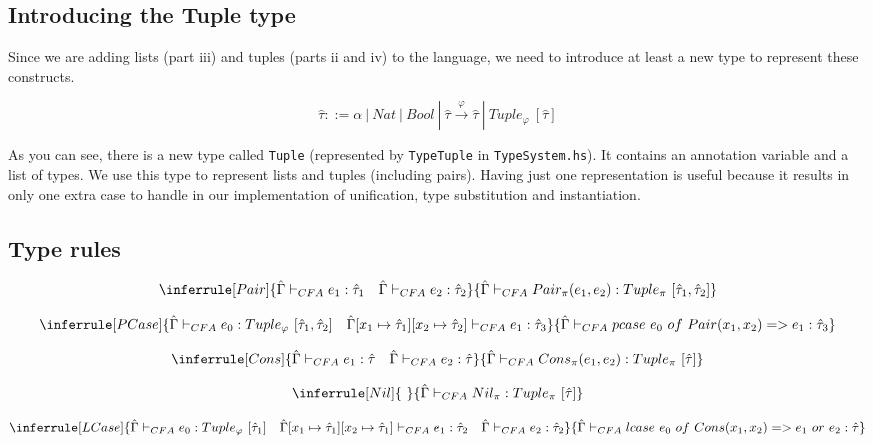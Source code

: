 \documentclass{article}
\begin{document}
\subsection{Introducing the Tuple type}

Since we are adding lists (part iii) and tuples (parts ii and iv) to the language, we need to introduce at least a new type to represent these constructs.

\[\hat{\tau} ::= \alpha\ |\ Nat\ |\ Bool\ |\ \hat{\tau} \overset{\varphi}{\rightarrow} \hat{\tau}\ |\ Tuple_\varphi\ [\hat{\tau}] \]

As you can see, there is a new type called \texttt{Tuple} (represented by \texttt{TypeTuple} in \texttt{TypeSystem.hs}).
It contains an annotation variable and a list of types.
We use this type to represent lists and tuples (including pairs).
Having just one representation is useful because it results in only one extra case to handle in our implementation of unification, type substitution and instantiation.

\subsection{Type rules}

\[
\inferrule[Pair]{\hat{\Gamma} \vdash_{CFA} e_1 : \hat{\tau}_1 \quad \hat{\Gamma} \vdash_{CFA} e_2 : \hat{\tau}_2}
{\hat{\Gamma} \vdash_{CFA} Pair_\pi(e_1, e_2) : Tuple_\pi\ [\hat{\tau}_1, \hat{\tau}_2]}
\]

\bigskip

\[
\inferrule[PCase]
{\hat{\Gamma} \vdash_{CFA} e_0 : Tuple_\varphi\ [\hat{\tau}_1, \hat{\tau}_2] \quad \hat{\Gamma}[x_1 \mapsto \hat{\tau}_1][x_2 \mapsto \hat{\tau}_2] \vdash_{CFA} e_1 : \hat{\tau}_3}
{\hat{\Gamma} \vdash_{CFA} pcase\ e_0\ of\ Pair(x_1, x_2) => e_1 : \hat{\tau}_3}
\]

\bigskip
\[
\inferrule[Cons]
{\hat{\Gamma} \vdash_{CFA} e_1 : \hat{\tau} \quad \hat{\Gamma} \vdash_{CFA} e_2 : \hat{\tau}}
{\hat{\Gamma} \vdash_{CFA} Cons_\pi(e_1, e_2) : Tuple_\pi\ [\hat{\tau}] }
\]

\bigskip

\[
\inferrule[Nil]{\ }{\hat{\Gamma} \vdash_{CFA} Nil_\pi : Tuple_\pi\ [\hat{\tau}]}
\]

\bigskip

\[
\inferrule[LCase]
{\hat{\Gamma} \vdash_{CFA} e_0 : Tuple_\varphi\ [\hat{\tau}_1] \quad \hat{\Gamma}[x_1 \mapsto \hat{\tau}_1][x_2 \mapsto \hat{\tau}_1] \vdash_{CFA} e_1 : \hat{\tau}_2 \quad \hat{\Gamma} \vdash_{CFA} e_2 : \hat{\tau}_2}
{\hat{\Gamma} \vdash_{CFA} lcase\ e_0\ of\ Cons(x_1, x_2) => e_1\ or\ e_2 : \hat{\tau}}
\]
\end{document}
